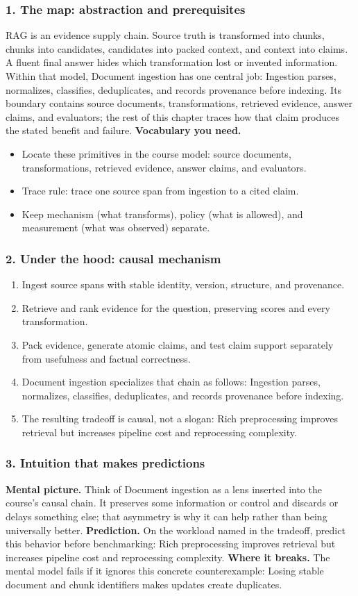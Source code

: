 \subsubsection*{1. The map: abstraction and prerequisites}
RAG is an evidence supply chain. Source truth is transformed into chunks, chunks into candidates, candidates into packed context, and context into claims. A fluent final answer hides which transformation lost or invented information.
Within that model, Document ingestion has one central job: Ingestion parses, normalizes, classifies, deduplicates, and records provenance before indexing. Its boundary contains source documents, transformations, retrieved evidence, answer claims, and evaluators; the rest of this chapter traces how that claim produces the stated benefit and failure.
\textbf{Vocabulary you need.}\begin{itemize}
\item Locate these primitives in the course model: source documents, transformations, retrieved evidence, answer claims, and evaluators.
\item Trace rule: trace one source span from ingestion to a cited claim.
\item Keep mechanism (what transforms), policy (what is allowed), and measurement (what was observed) separate.
\end{itemize}
\subsubsection*{2. Under the hood: causal mechanism}\begin{enumerate}
\item Ingest source spans with stable identity, version, structure, and provenance.
\item Retrieve and rank evidence for the question, preserving scores and every transformation.
\item Pack evidence, generate atomic claims, and test claim support separately from usefulness and factual correctness.
\item Document ingestion specializes that chain as follows: Ingestion parses, normalizes, classifies, deduplicates, and records provenance before indexing.
\item The resulting tradeoff is causal, not a slogan: Rich preprocessing improves retrieval but increases pipeline cost and reprocessing complexity.
\end{enumerate}
\subsubsection*{3. Intuition that makes predictions}
\textbf{Mental picture.} Think of Document ingestion as a lens inserted into the course's causal chain. It preserves some information or control and discards or delays something else; that asymmetry is why it can help rather than being universally better.
\textbf{Prediction.} On the workload named in the tradeoff, predict this behavior before benchmarking: Rich preprocessing improves retrieval but increases pipeline cost and reprocessing complexity.
\textbf{Where it breaks.} The mental model fails if it ignores this concrete counterexample: Losing stable document and chunk identifiers makes updates create duplicates.
